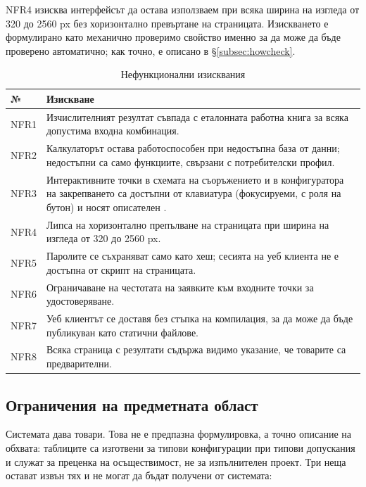 NFR4 изисква интерфейсът да остава използваем при всяка ширина на изгледа от 320 до
2560 px без хоризонтално превъртане на страницата. Изискването е формулирано като
механично проверимо свойство именно за да може да бъде проверено автоматично; как
точно, е описано в §\ref{subsec:howcheck}.

\begin{table}[htbp]
\centering
\caption{Нефункционални изисквания}
\label{tab:nfr}
{\fontsize{10}{12}\selectfont
\begin{tabular}{@{}lL{11.4cm}@{}}
\toprule
\textbf{№} & \textbf{Изискване} \\
\midrule
NFR1 & Изчислителният резултат съвпада с еталонната работна книга за всяка допустима входна комбинация. \\
NFR2 & Калкулаторът остава работоспособен при недостъпна база от данни; недостъпни са само функциите, свързани с потребителски профил. \\
NFR3 & Интерактивните точки в схемата на съоръжението и в конфигуратора на закрепването са достъпни от клавиатура (фокусируеми, с роля на бутон) и носят описателен . \\
NFR4 & Липса на хоризонтално препълване на страницата при ширина на изгледа от 320 до 2560 px. \\
NFR5 & Паролите се съхраняват само като хеш; сесията на уеб клиента не е достъпна от скрипт на страницата. \\
NFR6 & Ограничаване на честотата на заявките към входните точки за удостоверяване. \\
NFR7 & Уеб клиентът се доставя без стъпка на компилация, за да може да бъде публикуван като статични файлове. \\
NFR8 & Всяка страница с резултати съдържа видимо указание, че товарите са предварителни. \\
\bottomrule
\end{tabular}}
\end{table}

\subsection{Ограничения на предметната област}
\label{subsec:limits}

Системата дава  товари. Това не е предпазна формулировка, а точно
описание на обхвата: таблиците са изготвени за типови конфигурации при типови
допускания и служат за преценка на осъществимост, не за изпълнителен проект. Три
неща остават извън тях и не могат да бъдат получени от системата:


